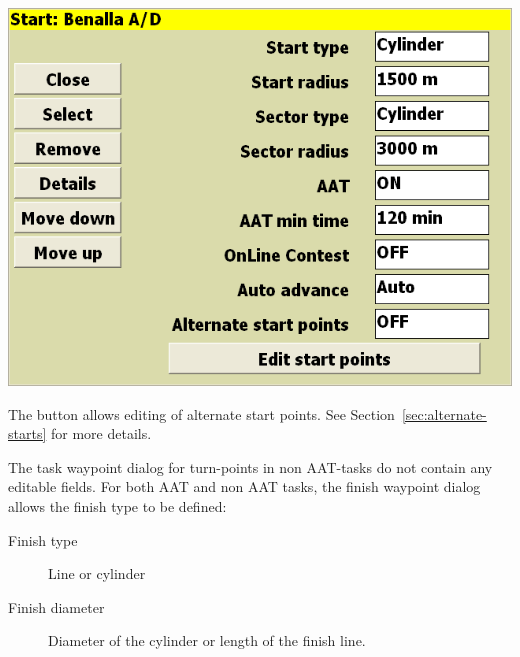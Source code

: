 \documentclass[a4paper,12pt]{refrep}
\begin{document}
\begin{center}
\includegraphics[angle=0,width=\linewidth,keepaspectratio='true']{figures/dialog-taskedit3.png}
\end{center}

The  button allows editing of alternate
start points.  See Section~\ref{sec:alternate-starts} for more
details.

The task waypoint dialog for turn-points in non AAT-tasks do not
contain any editable fields.  For both AAT and non AAT tasks, the
finish waypoint dialog allows the finish type to be defined:
\begin{description}
\item[Finish type] Line or cylinder
\item[Finish diameter] Diameter of the cylinder or length of the finish line.
\end{description}
\end{document}

